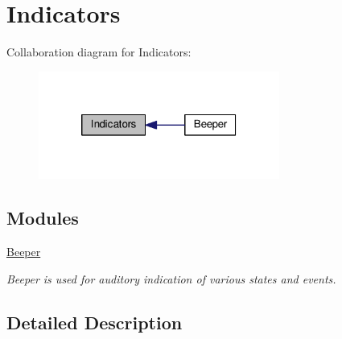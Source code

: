 \hypertarget{group__INDICATORS}{\section{Indicators}
\label{group__INDICATORS}
}
Collaboration diagram for Indicators\+:\nopagebreak
\begin{figure}[H]
\begin{center}
\leavevmode
\includegraphics[width=224pt]{group__INDICATORS}
\end{center}
\end{figure}
\subsection*{Modules}
\begin{DoxyCompactItemize}
\item 
\hyperlink{group__BEEPER}{Beeper}
\begin{DoxyCompactList}\small\item\em Beeper is used for auditory indication of various states and events. \end{DoxyCompactList}\end{DoxyCompactItemize}


\subsection{Detailed Description}
